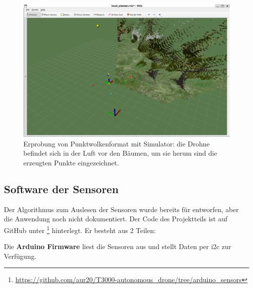 \begin{figure}[!h]
    \centering
    \includegraphics[width=0.7\linewidth]{images/ultra_pc_test_sim.png}
    \caption[Erprobung von Punktwolkenformat mit Simulator]{Erprobung von Punktwolkenformat mit Simulator: die Drohne befindet sich in der Luft vor den Bäumen, um sie herum sind die erzeugten Punkte eingezeichnet.}
    \label{fig:ultra_pc_test_sim}
\end{figure}

\subsection{Software der Sensoren}
Der Algorithmus zum Auslesen der Sensoren wurde bereits für \cite[Kapitel 4.4]{markusreinErweiterungBestehenderDrohnen2023} entworfen, aber die Anwendung noch nicht dokumentiert. Der Code des Projektteils ist auf GitHub unter \footnote{\url{https://github.com/aur20/T3000-autonomous_drone/tree/arduino_sensors}} hinterlegt. Er besteht aus 2 Teilen:

Die \textbf{\large Arduino Firmware} liest die Sensoren aus und stellt Daten per \gls{i2c} zur Verfügung.

